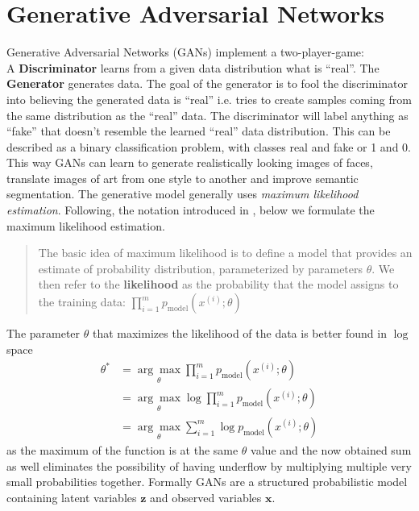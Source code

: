 \section{Generative Adversarial Networks}
Generative Adversarial Networks (GANs) implement a two-player-game:\\
A \textbf{Discriminator} learns from a given data distribution what is ``real''. The \textbf{Generator} generates data. The goal of the generator is to fool the discriminator into believing the generated data is ``real'' i.e. tries to create samples coming from the same distribution as the ``real'' data. The discriminator will label anything as ``fake'' that doesn't resemble the learned ``real'' data distribution. This can be described as a binary classification problem, with classes real and fake or 1 and 0. This way GANs can learn to generate realistically looking images of faces, translate images of art from one style to another and improve semantic segmentation. The generative model generally uses \textit{maximum likelihood estimation}. Following, the notation introduced in \cite{DBLP:journals/corr/Goodfellow17}, below we formulate the maximum likelihood estimation.
\begin{quote}
	The basic idea of maximum likelihood is to define a model that provides an estimate of probability distribution, parameterized by parameters $\theta$. We then refer to the \textbf{likelihood} as the probability that the model assigns to the training data: $\prod_{i=1}^{m}p_{\text{model}}(x^{(i)}; \theta)$
\end{quote}
The parameter $\theta$ that maximizes the likelihood of the data is better found in $\log$ space
\begin{align}
	\theta^* &= \underset{\theta}{\arg \max} \prod_{i = 1}^{m} p_{\text{model}} (x^{(i)}; \theta)\\
	&= \underset{\theta}{\arg \max} \log \prod_{i=1}^{m} p_{\text{model}}(x^{(i)}; \theta)\\
	&= \underset{\theta}{\arg \max} \sum_{i = 1}^{m} \log p_{\text{model}}(x^{(i)}; \theta)
\end{align}
as the maximum of the function is at the same $\theta$ value and the now obtained sum as well eliminates the possibility of having underflow by multiplying multiple very small probabilities together. 
Formally GANs are a structured probabilistic model containing latent variables $\mathbf{z}$ and observed variables $\mathbf{x}$.
